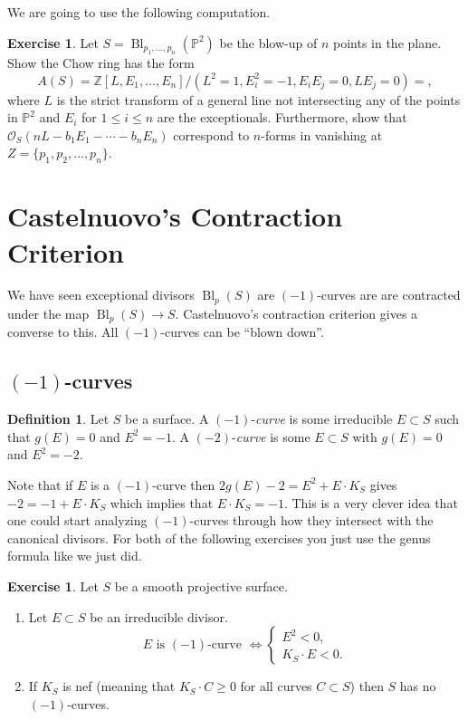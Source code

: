 \documentclass[12pt]{article}
\numberwithin{equation}{section}
\theoremstyle{definition}
\newtheorem{definition}[theorem]{Definition}
\newtheorem{exercise}[theorem]{Exercise}
\theoremstyle{remark}
\newcommand{\ZZ}{\mathbb{Z}}
\newcommand{\Ocal}{\mathcal{O}}
\newcommand{\PP}{\mathbb{P}}
\newcommand{\Bl}{\operatorname{Bl}}
\begin{document}
We are going to use the following computation. 
\begin{exercise}\label{ex:chow-ring-of-blow-up}
	Let $S=\Bl_{p_1,\ldots,p_n}(\PP^2)$ be the blow-up of $n$ points in the plane. 
	Show the Chow ring has the form
	$$A(S) = \ZZ[L,E_1,\ldots,E_n]/(L^2=1,E_i^2=-1,E_iE_j=0,LE_j=0)=,$$
	where $L$ is the strict transform of a general line not intersecting any of the points in $\PP^2$ and $E_i$ for $1\leq i \leq n$ are the exceptionals.
	Furthermore, show that $\Ocal_S(nL-b_1E_1-\cdots-b_nE_n)$ correspond to $n$-forms in vanishing at $Z=\lbrace p_1,p_2,\ldots, p_n\rbrace$. 
\end{exercise}

\section{Castelnuovo's Contraction Criterion}

We have seen exceptional divisors $\Bl_p(S)$ are $(-1)$-curves are are contracted under the map $\Bl_p(S)\to S$. 
Castelnuovo's contraction criterion gives a converse to this. 
All $(-1)$-curves can be ``blown down''.

\subsection{$(-1)$-curves}

\begin{definition}
	Let $S$ be a surface. 
	A $(-1)$-\emph{curve} is some irreducible $E\subset S$ such that $g(E)=0$ and $E^2=-1$. A $(-2)$-\emph{curve} is some $E\subset S$ with $g(E)=0$ and $E^2=-2$.
\end{definition}

Note that if $E$ is a $(-1)$-curve then 
$2g(E)-2 = E^2+E\cdot K_S$ gives $-2=-1+E\cdot K_S$ which implies that $E\cdot K_S=-1$. 
This is a very clever idea that one could start analyzing $(-1)$-curves through how they intersect with the canonical divisors. 
For both of the following exercises you just use the genus formula like we just did.
\begin{exercise}
	Let $S$ be a smooth projective surface. 
	\begin{enumerate}
		\item Let $E \subset S$ be an irreducible divisor. 
		$$\mbox{ $E$ is $(-1)$-curve } \iff 
		\begin{cases}
		E^2<0, & \\
		K_S\cdot E<0. & 
		\end{cases}$$
		\item If $K_S$ is nef (meaning that $K_S\cdot C\geq 0$ for all curves $C \subset S$) then $S$ has no $(-1)$-curves. 
	\end{enumerate}
\end{exercise}
\end{document}
